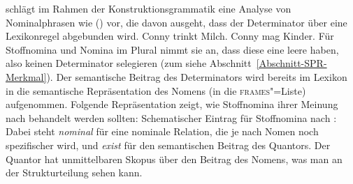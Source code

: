 \mbox{}\citet[]{Michaelis2006a} schlägt im Rahmen der
Konstruktionsgrammatik eine Analyse von Nominalphrasen wie () vor, die davon ausgeht, dass der
Determinator über eine Lexikonregel abgebunden wird.
\eal
\ex Conny trinkt Milch.
\ex Conny mag Kinder.
\zl
Für Stoffnomina und Nomina im  Plural nimmt sie an, dass diese eine leere \sprl haben, also keinen
Determinator selegieren (zum \sprm siehe Abschnitt~\ref{Abschnitt-SPR-Merkmal}). Der semantische Beitrag des
Determinators wird bereits im Lexikon in die semantische Repräsentation des Nomens (in die
\textsc{frames}"=Liste) aufgenommen. Folgende Repräsentation zeigt, wie Stoffnomina ihrer Meinung
nach behandelt werden sollten:
\ea
Schematischer Eintrag für Stoffnomina nach \citet[]{Michaelis2006a}:\\
\z
Dabei steht \emph{nominal} für eine nominale Relation, die je nach Nomen noch spezifischer wird, und
\emph{exist} für den semantischen Beitrag des Quantors. Der Quantor hat unmittelbaren Skopus über
den Beitrag des Nomens, was man an der Strukturteilung  sehen kann.

